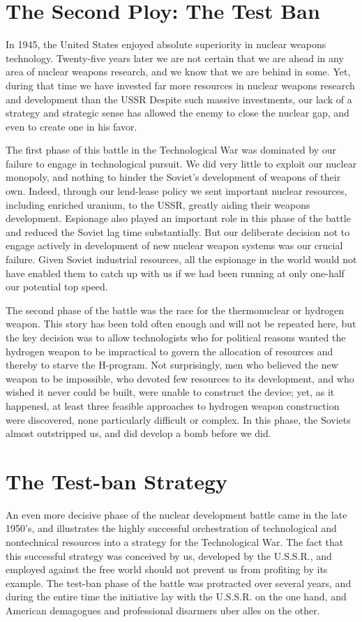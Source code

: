 \section{The Second Ploy: The Test Ban}
In 1945, the United States enjoyed absolute superiority in nuclear weapons technology. Twenty-five years later we are not certain that we are ahead in any area of nuclear weapons research, and we know that we are behind in some. Yet, during that time we have invested far more resources in nuclear weapons research and development than the USSR Despite such massive investments, our lack of a strategy and strategic sense has allowed the enemy to close the nuclear gap, and even to create one in his favor.

The first phase of this battle in the Technological War was dominated by our failure to engage in technological pursuit. We did very little to exploit our nuclear monopoly, and nothing to hinder the Soviet's development of weapons of their own. Indeed, through our lend-lease policy we sent important nuclear resources, including enriched uranium, to the USSR, greatly aiding their weapons development. Espionage also played an important role in this phase of the battle and reduced the Soviet lag time substantially. But our deliberate decision not to engage actively in development of new nuclear weapon systems was our crucial failure. Given Soviet industrial resources, all the espionage in the world would not have enabled them to catch up with us if we had been running at only one-half our potential top speed.

The second phase of the battle was the race for the thermonuclear or hydrogen weapon. This story has been told often enough and will not be repeated here, but the key decision was to allow technologists who for political reasons wanted the hydrogen weapon to be impractical to govern the allocation of resources and thereby to starve the H-program. Not surprisingly, men who believed the new weapon to be impossible, who devoted few resources to its development, and who wished it never could be built, were unable to construct the device; yet, as it happened, at least three feasible approaches to hydrogen weapon construction were discovered, none particularly difficult or complex. In this phase, the Soviets almost outstripped us, and did develop a bomb before we did.

\section{The Test-ban Strategy}
An even more decisive phase of the nuclear development battle came in the late 1950's, and illustrates the highly successful orchestration of technological and nontechnical resources into a strategy for the Technological War. The fact that this successful strategy was conceived by us, developed by the U.S.S.R., and employed against the free world should not prevent us from profiting by its example. The test-ban phase of the battle was protracted over several years, and during the entire time the initiative lay with the U.S.S.R. on the one hand, and American demagogues and professional disarmers uber alles on the other.

